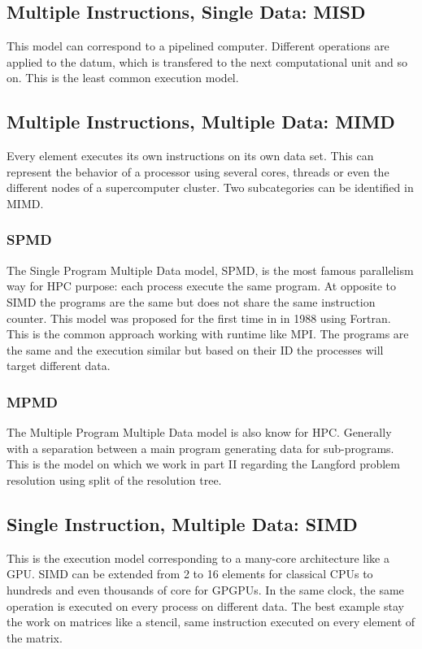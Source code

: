 \subsection{Multiple Instructions, Single Data: MISD}
This model can correspond to a pipelined computer.
Different operations are applied to the datum, which is transfered to the next computational unit and so on. 
This is the least common execution model.


\subsection{Multiple Instructions, Multiple Data: MIMD}
Every element executes its own instructions on its own data set. 
This can represent the behavior of a processor using several cores, threads or even the different nodes of a supercomputer cluster. 
Two subcategories can be identified in MIMD.

\subsubsection{SPMD}
The Single Program Multiple Data model, SPMD, is the most famous parallelism way for HPC purpose: each process execute the same program. 
At opposite to SIMD the programs are the same but does not share the same instruction counter. 
This model was proposed for the first time in \cite{darema1988single} in 1988 using Fortran.
This is the common approach working with runtime like MPI. 
The programs are the same and the execution similar but based on their ID the processes will target different data. 

\subsubsection{MPMD}
The Multiple Program Multiple Data model is also know for HPC. 
Generally with a separation between a main program generating data for sub-programs. 
This is the model on which we work in part II regarding the Langford problem resolution using split of the resolution tree.

\subsection{Single Instruction, Multiple Data: SIMD}
This is the execution model corresponding to a many-core architecture like a GPU. 
SIMD can be extended from 2 to 16 elements for classical CPUs to hundreds and even thousands of core for GPGPUs. 
In the same clock, the same operation is executed on every process on different data. 
The best example stay the work on matrices like a stencil, same instruction executed on every element of the matrix. 

